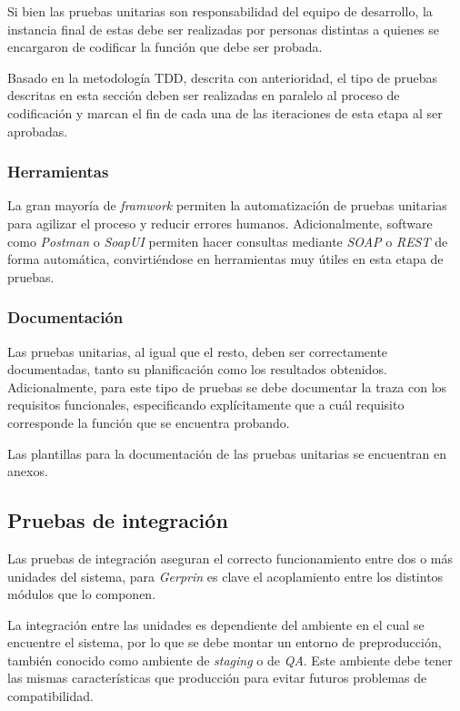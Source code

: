 Si bien las pruebas unitarias son responsabilidad del equipo de desarrollo, la instancia final de estas debe ser realizadas por personas distintas a quienes se encargaron de codificar la función que debe ser probada.

 Basado en la metodología TDD, descrita con anterioridad, el tipo de pruebas descritas en esta sección deben ser realizadas en paralelo al proceso de codificación y marcan el fin de cada una de las iteraciones de esta etapa al ser aprobadas. 

\subsubsection{Herramientas}

La gran mayoría de \emph{framwork} permiten la automatización de pruebas unitarias para agilizar el proceso y reducir errores humanos. Adicionalmente, software como \emph{Postman} o \emph{SoapUI} permiten hacer consultas mediante \emph{SOAP} o \emph{REST} de forma automática, convirtiéndose en herramientas muy útiles en esta etapa de pruebas.

\subsubsection{Documentación}

Las pruebas unitarias, al igual que el resto, deben ser correctamente documentadas, tanto su planificación como los resultados obtenidos. Adicionalmente, para este tipo de pruebas se debe documentar la traza con los requisitos funcionales, especificando explícitamente que a cuál requisito corresponde la función que se encuentra probando.

Las plantillas para la documentación de las pruebas unitarias se encuentran en anexos.

\subsection{Pruebas de integración}

Las pruebas de integración aseguran el correcto funcionamiento entre dos o más unidades del sistema, para \emph{Gerprin} es clave el acoplamiento entre los distintos módulos que lo componen.

La integración entre las unidades es dependiente del ambiente en el cual se encuentre el sistema, por lo que se debe montar un entorno de preproducción, también conocido como ambiente de \emph{staging} o de \emph{QA}. Este ambiente debe tener las mismas características que producción para evitar futuros problemas de compatibilidad.

